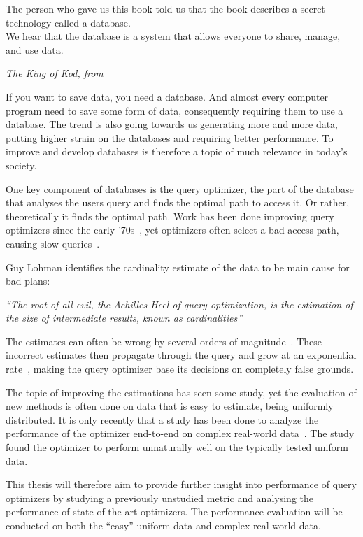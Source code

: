 \epigraph{The person who gave us this book told us that the book describes a
  secret technology called a database.\\
  We hear that the database is a system that allows everyone to share, manage, and
  use data.}{\textit{The King of Kod, from~\cite[p.
    6]{takahashi_2009_manga_tmgtd}}}

If you want to save data, you need a database. And almost every computer program
need to save some form of data, consequently requiring them to use a database.
The trend is also going towards us generating more and more data, putting higher
strain on the databases and requiring better performance. To improve and develop
databases is therefore a topic of much relevance in today's society.

One key component of databases is the query optimizer, the part of the database
that analyses the users query and finds the optimal path to access it. Or
rather, theoretically it finds the optimal path. Work has been done improving
query optimizers since the early '70s~\cite{chaudhuri_1998_overview_aooqoirs},
yet optimizers often select a bad access path, causing slow
queries~\cite{leis_2015_how_hgaqor}.

Guy Lohman identifies the cardinality estimate of the data to be main cause for bad plans:

\textit{``The root of all evil, the Achilles Heel of query optimization, is the
  estimation of the size of intermediate results, known as cardinalities''}

The estimates can often be wrong by several orders of
magnitude~\cite{lohman_query_iqoap}. These incorrect estimates then propagate
through the query and grow at an exponential
rate~\cite{ioannidis_1991_propagation_otpoeitsojr}, making the query optimizer
base its decisions on completely false grounds.

The topic of improving the estimations has seen some study, yet the evaluation
of new methods is often done on data that is easy to estimate, being uniformly
distributed. It is only recently that a study has been done to analyze the
performance of the optimizer end-to-end on complex real-world
data~\cite{leis_2015_how_hgaqor}. The study found the optimizer to perform
unnaturally well on the typically tested uniform data.

This thesis will therefore aim to provide further insight into performance of
query optimizers by studying a previously unstudied metric and analysing the
performance of state-of-the-art optimizers. The performance evaluation will be
conducted on both the ``easy'' uniform data and complex real-world data.

